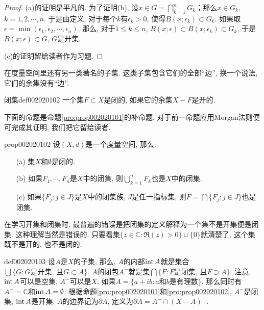 \begin{proof}
(a)的证明是平凡的. 为了证明(b), 设$x \in G = \bigcap_{k=1}^{n}{G_k}$；那么$x \in G_k$, $k=1,2,\cdots,n$. 于是由定义, 对于每个$k$有$\epsilon_k > 0$, 使得$B(x;\epsilon_k) \subset G_k$. 如果取$\epsilon=\min(\epsilon_1,\epsilon_2,\cdots, \epsilon_n)$, 那么, 对于$1 \le k \le n$, $B(x;\epsilon) \subset B(x;\epsilon_k) \subset G_k$, 于是$B(x; \epsilon) \subset G$, $G$是开集. 

(c)的证明留给读者作为习题. 
\end{proof}

在度量空间里还有另一类著名的子集. 这类子集包含它们的全部“边”, 换一个说法, 它们的余集没有“边”. 

\begin{definition}{闭集}{def002020102}
一个集$F \subset X$是闭的, 如果它的余集$X-F$是开的. 
\end{definition}

下面的命题是命题\ref{pro:prop002020101}的补命题. 对于前一命题应用Morgan法则便可完成其证明, 我们把它留给读者. 

\begin{proposition}{}{prop002020102}
设$(X, d)$是一个度量空间, 那么: 
\begin{enumerate}
\item[(a)]集$X$和$\emptyset$是闭的. 
\item[(b)]如果$F_1,\cdots, F_n$是$X$中的闭集, 则$\bigcup_{k=1}^{n}{F_k}$也是$X$中的闭集. 
\item[(c)]如果$\{F_j:j \in J\}$是$X$中的闭集族, $J$是任一指标集, 则$F = \bigcap\{F_j:j \in J\}$也是闭集. 
\end{enumerate}
\end{proposition}

在学习开集和闭集时, 最普遍的错误是把闭集的定义解释为一个集不是开集便是闭集. 这种理解当然是错误的. 只要看集$\{z \in \mathbb{C} : \Re{(z)} > 0\} \cup \{0\}$就清楚了, 这个集既不是开的, 也不是闭的. 

\begin{definition}{}{def002020103}
设$A$是$X$的子集, 那么, $A$的内部$\operatorname{int}{A}$就是集合$\bigcup\{G: G\text{是开集, 且}G \subset A\}$. $A$的闭包$A^-$就是集$\bigcap\{F: F\text{是闭集, 且}F \supset A\}$. 注意, $\operatorname{int}{A}$可以是空集, $A^-$可以是$X$. 如果$A = \{a + ib : a\text{和}b\text{是有理数}\}$, 那么同时有$A^-=\mathbb{C}$和$\operatorname{int}{A} = \emptyset$. 根据命题\ref{pro:prop002020101}和\ref{pro:prop002020102}, $A^-$是闭集, $\operatorname{int}{A}$是开集. $A$的边界记为$\partial{A}$, 定义为$\partial{A} = A^- \cap (X-A)^-$. 
\end{definition}

